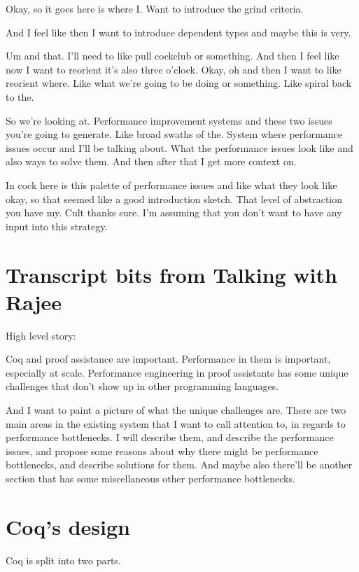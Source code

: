 \begin{subappendices}
Okay, so it goes here is where I. Want to introduce the grind criteria.

And I feel like then I want to introduce dependent types and maybe this is very.

Um and that. I'll need to like pull cockclub or something. And then I feel like now I want to reorient it's also three o'clock. Okay, oh and then I want to like reorient where. Like what we're going to be doing or something. Like spiral back to the.

So we're looking at. Performance improvement systems and these two issues you're going to generate. Like broad swaths of the. System where performance issues occur and I'll be talking about. What the performance issues look like and also ways to solve them. And then after that I get more context on.

In cock here is this palette of performance issues and like what they look like okay, so that seemed like a good introduction sketch. That level of abstraction you have my. Cult thanks sure. I'm assuming that you don't want to have any input into this strategy.


\section{Transcript bits from Talking with Rajee}
High level story:

Coq and proof assistance are important. Performance in them is important, especially at scale. Performance engineering in proof assistants has some unique challenges that don't show up in other programming languages.

And I want to paint a picture of what the unique challenges are.  There are two main areas in the existing system that I want to call attention to, in regards to performance bottlenecks.  I will describe them, and describe the performance issues, and propose some reasons about why there might be performance bottlenecks, and describe solutions for them. And maybe also there'll be another section that has some miscellaneous other performance bottlenecks.


\section{Coq's design}
Coq is split into two parts.


\end{subappendices}
